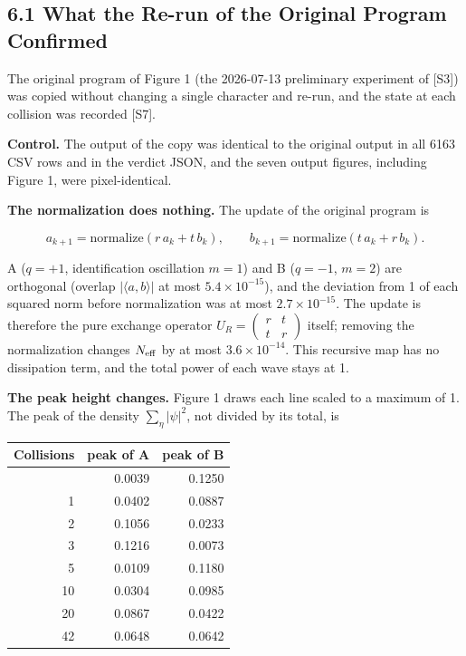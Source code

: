 \documentclass[
  a4paper,
]{article}
\newcounter{none} %
\begin{document}
\subsection{6.1 What the Re-run of the Original Program
Confirmed}\label{what-the-re-run-of-the-original-program-confirmed}

The original program of Figure 1 (the 2026-07-13 preliminary experiment
of {[}S3{]}) was copied without changing a single character and re-run,
and the state at each collision was recorded {[}S7{]}.

\textbf{Control.} The output of the copy was identical to the original
output in all 6163 CSV rows and in the verdict JSON, and the seven
output figures, including Figure 1, were pixel-identical.

\textbf{The normalization does nothing.} The update of the original
program is

\[
a_{k+1}=\mathrm{normalize}(r\,a_k+t\,b_k),\qquad b_{k+1}=\mathrm{normalize}(t\,a_k+r\,b_k).
\]

A (\(q=+1\), identification oscillation \(m=1\)) and B (\(q=-1\),
\(m=2\)) are orthogonal (overlap \(|\langle a,b\rangle|\) at most
\(5.4\times10^{-15}\)), and the deviation from 1 of each squared norm
before normalization was at most \(2.7\times10^{-15}\). The update is
therefore the pure exchange operator
\(U_R=\begin{pmatrix}r&t\\t&r\end{pmatrix}\) itself; removing the
normalization changes \(N_{\rm eff}\) by at most \(3.6\times10^{-14}\).
This recursive map has no dissipation term, and the total power of each
wave stays at 1.

\textbf{The peak height changes.} Figure 1 draws each line scaled to a
maximum of 1. The peak of the density \(\sum_\eta|\psi|^2\), not divided
by its total, is

{\def\LTcaptype{none} %
\begin{longtable}[]{@{}rrr@{}}
\toprule\noalign{}
Collisions & peak of A & peak of B \\
\midrule\noalign{}
\endhead
\bottomrule\noalign{}
\endlastfoot
0 & 0.0039 & 0.1250 \\
1 & 0.0402 & 0.0887 \\
2 & 0.1056 & 0.0233 \\
3 & 0.1216 & 0.0073 \\
5 & 0.0109 & 0.1180 \\
10 & 0.0304 & 0.0985 \\
20 & 0.0867 & 0.0422 \\
42 & 0.0648 & 0.0642 \\
\end{longtable}
}
\end{document}
